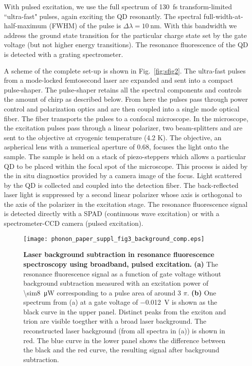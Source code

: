 \documentclass[aps,prl,reprint,superscriptaddress]{revtex4-1}
\begin{document}
With pulsed excitation, we use the full spectrum of \SI{130}{\femto\second} transform-limited ``ultra-fast" pulses, again exciting the QD resonantly. The spectral full-width-at-half-maximum (FWHM) of the pulse is $\Delta \lambda=\SI{10}{\nano\meter}$. With this bandwidth we address the ground state transition for the particular charge state set by the gate voltage (but not higher energy transitions). The resonance fluorescence of the QD is detected with a grating spectrometer.

A scheme of the complete set-up is shown in Fig.\ \ref{fig:sfig2}. The ultra-fast pulses from a mode-locked femtosecond laser are expanded and sent into a compact pulse-shaper. The pulse-shaper retains all the spectral components and controls the amount of chirp as described below. From here the pulses pass through power control and polarization optics and are then coupled into a single mode optical fiber. The fiber transports the pulses to a confocal microscope. In the microscope, the excitation pulses pass through a linear polarizer, two beam-splitters and are sent to the objective at cryogenic temperature (4.2 K). The objective, an aspherical lens with a numerical aperture of 0.68, focuses the light onto the sample. The sample is held on a stack of piezo-steppers which allows a particular QD to be placed within the focal spot of the microscope. This process is aided by the in situ diagnostics provided by a camera image of the focus. Light scattered by the QD is collected and coupled into the detection fiber. The back-reflected laser light is suppressed by a second linear polarizer whose axis is orthogonal to the axis of the polarizer in the excitation stage. The resonance fluorescence signal is detected directly with a SPAD (continuous wave excitation) or with a spectrometer-CCD camera (pulsed excitation).

\begin{figure}[b]{}
	\centering
	\texttt{[image: phonon\_paper\_suppl\_fig3\_background\_comp.eps]}
	\caption{
	\textbf{Laser background subtraction in resonance fluorescence spectroscopy using broadband, pulsed excitation.}
	\textbf{(a)} The resonance fluorescence signal as a function of gate voltage without background subtraction measured with an excitation power of \SI{\sim8}{\micro\watt} corresponding to a pulse area of around 3 $\pi$.
	\textbf{(b)} One spectrum from (a) at a gate voltage of \SI{-0.012}{\volt} is shown as the black curve in the upper panel. Distinct peaks from the exciton and trion are visible toegther with a broad laser background. The reconstructed laser background (from all spectra in (a)) is shown in red. The blue curve in the lower panel shows the difference between the black and the red curve, the resulting signal after background subtraction.
	}
	\label{fig:sfig3}
\end{figure}
\end{document}
